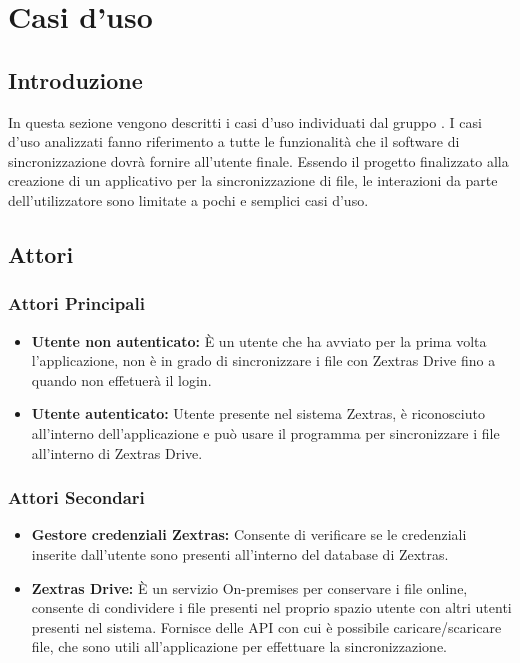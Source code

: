 \section{Casi d'uso}
\subsection{Introduzione}
In questa sezione vengono descritti i casi d'uso individuati dal gruppo \gruppo{}.
I casi d'uso analizzati fanno riferimento a tutte le funzionalità che il software di sincronizzazione dovrà fornire all'utente finale.\newline
Essendo il progetto finalizzato alla creazione di un applicativo per la sincronizzazione di file, le interazioni da parte dell'utilizzatore sono limitate a pochi e semplici casi d'uso.

\subsection{Attori}

\subsubsection{Attori Principali}
\begin{itemize}
\item \textbf{Utente non autenticato:} È un utente che ha avviato per la prima volta l'applicazione, non è in grado di sincronizzare i file con Zextras Drive fino a quando non effetuerà il login.
\item \textbf{Utente autenticato:} Utente presente nel sistema Zextras, è riconosciuto all'interno dell'applicazione e può usare il programma per sincronizzare i file all'interno di Zextras Drive.
\end{itemize}

\subsubsection{Attori Secondari}
\begin{itemize}
\item \textbf{Gestore credenziali Zextras:} Consente di verificare se le credenziali inserite dall'utente sono presenti all'interno del database di Zextras.
\item \textbf{Zextras Drive:} È un servizio On-premises per conservare i file online, consente di condividere i file presenti nel proprio spazio utente con altri utenti presenti nel sistema. Fornisce delle API con cui è possibile caricare/scaricare file, che sono utili all'applicazione per effettuare la sincronizzazione.
\end{itemize}

\newpage





